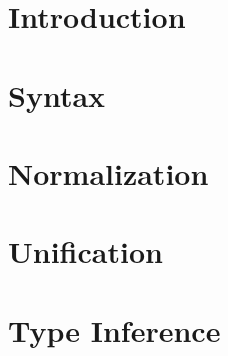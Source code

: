 \documentclass[acmsmall,review,anonymous]{acmart}
\begin{document}
\maketitle

\section{Introduction}
\label{sec:intro}


\section{Syntax}
\label{sec:syntax}


\section{Normalization}
\label{sec:normalization}


\section{Unification}
\label{sec:unification}


\section{Type Inference}
\label{sec:typeinference}





\appendix
\end{document}
